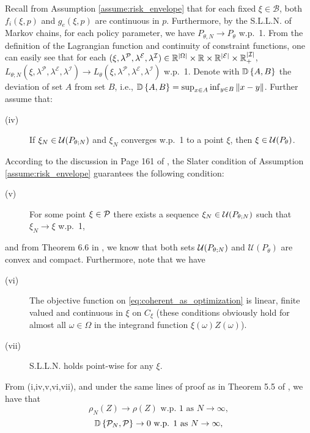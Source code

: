 Recall from Assumption \ref{assume:risk_envelope} that for each fixed $\xi\in\mathcal B$, both $f_i(\xi,p)$ and $g_e(\xi,p)$ are continuous in $p$. Furthermore, by the S.L.L.N. of Markov chains, for each policy parameter, we have $P_{\theta,N}\rightarrow P_{\theta}$ w.p.~1. From the definition of the Lagrangian function and continuity of constraint functions,  one can easily see that for each $(\xi,\lambda^{\mathcal P},\lambda^{\mathcal E},\lambda^{\mathcal I})\in{\mathbb{R}}^{|\Omega|}\times{\mathbb{R}}\times{\mathbb{R}}^{|\mathcal E|}\times{\mathbb{R}}_{+}^{|\mathcal I|}$, $L_{\theta;N}(\xi,\lambda^{\mathcal P},\lambda^{\mathcal E},\lambda^{\mathcal I})\rightarrow L_{\theta}(\xi,\lambda^{\mathcal P},\lambda^{\mathcal E},\lambda^{\mathcal I})$ w.p.~1. Denote with $\mathbb D \left\{ {A}, {B}\right\}$ the deviation of set $A$ from set $B$, i.e., $\mathbb D \left\{ {A}, {B}\right\}=\sup_{x\in A}\inf_{y\in B}\|x-y\|$.  Further assume that:
\begin{description}
\item[(iv)] If $\xi_N \in \mathcal U(P_{\theta;N})$ and $\xi_N$ converges w.p.~1 to a point $\xi$, then $\xi\in\mathcal U(P_{\theta})$.
\end{description}
According to the discussion in Page 161 of \citet{Shapiro2009}, the Slater condition of Assumption \ref{assume:risk_envelope} guarantees the following condition:
\begin{description}
\item[(v)] For some point $\xi \in \mathcal P$ there exists a sequence $\xi_N \in \mathcal U(P_{\theta;N})$ such that $\xi_N \to \xi$ w.p.~1,
\end{description}
and from Theorem 6.6 in \citet{Shapiro2009}, we know that both sets $ \mathcal U(P_{\theta;N})$ and $ \mathcal U(P_\theta)$ are convex and compact.
Furthermore, note that we have
\begin{description}
\item[(vi)] The objective function on \eqref{eq:coherent_as_optimization} is linear, finite valued and continuous in $\xi$ on $C_\xi$ (these conditions obviously hold for almost all $\omega\in\Omega$ in the integrand function $\xi(\omega)Z(\omega)$).
\item[(vii)] S.L.L.N. holds point-wise for any $\xi$.
\end{description}
From (i,iv,v,vi,vii), and under the same lines of proof as in Theorem 5.5 of \citet{Shapiro2009}, we have that
\begin{equation}\label{eq:consistency_prf_1}
    \rho_N(Z) \to \rho(Z) \textrm{ w.p. } 1 \textrm{ as } N \to \infty,
\end{equation}
\begin{equation}\label{eq:consistency_prf_2}
    \mathbb D \left\{ {\mathcal P_N}, {\mathcal P}\right\} \to 0 \textrm{ w.p. } 1 \textrm{ as } N \to \infty,
\end{equation}

